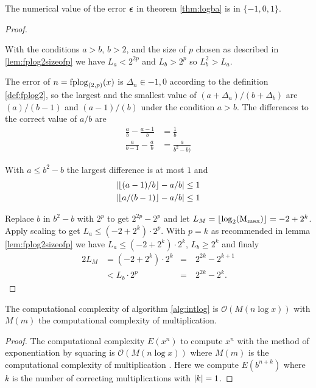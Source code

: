 \begin{cor}\label{cor:deltaisone}
The numerical value of the error $\boldsymbol{\epsilon}$ in theorem \ref{thm:logba} is in $\{-1, 0, 1\}$.
\end{cor}
\begin{proof}\label{proof:deltaisone}
\begin{proofsec}\label{proofsec:lalbratio}
With the conditions $a > b$, $b > 2$, and the size of $p$ chosen as described in
\ref{lem:fplog2sizeofp} we have $L_a < 2^{2p}$ and $L_b > 2^p$ so $L_b^2 > L_a $.
\end{proofsec}
\begin{proofsec}
The error of $n = \operatorname{fplog}_{(2,p)}(x)$ is $\Delta_n \in {-1, 0}$ according to the
definition \ref{def:fplog2}, so the largest and the smallest value of
$(a+\Delta_a)/(b + \Delta_b)$ are $(a)/(b-1)$
and $(a-1)/(b)$ under the condition $a>b$. The differences to the correct value of $a/b$ are
\begin{align}
\frac{a}{b} - \frac{a-1}{b} &= \frac{1}{b}\\
\frac{a}{b-1} - \frac{a}{b} &= \frac{a}{b^2 - b)}
\end{align}


With $a \le b^2 - b$ the largest difference is at most $1$ and
\begin{align}
\left\lvert\left\lfloor(a-1)/b\right\rfloor - a/b\right\rvert &\le 1\\
\left\lvert\left\lfloor a/(b-1)\right\rfloor - a/b\right\rvert &\le 1
\end{align}
\end{proofsec}
Replace $b$ in $b^2 - b$ with $2^p$ to get $2^{2p} - 2^p$ and let
$L_M =\left\lfloor\log_2(\textrm{M}_{\textrm{max}})\right\rfloor = -2 + 2^k$.
Apply scaling to get $L_a \le (-2 + 2^k)\cdot 2^p$. With $p = k$ as recommended in
lemma \ref{lem:fplog2sizeofp} we have $L_a \le (-2 + 2^k)\cdot 2^k$, $L_b \ge 2^k$ and
finaly
\begin{alignat}{2}
 L_M &= (-2 + 2^k)\cdot 2^k &=&\: 2^{2k} - 2^{k + 1}\\ 
     &< L_b \cdot 2^p &=&\:  2^{2k} - 2^k.
\end{alignat}
\end{proof}


\begin{lem}
The computational complexity of algorithm \ref{alg:intlog}  is $\mathcal{O}(M(n \log x))$ with
$M(m)$ the computational complexity of multiplication.
\end{lem}
\begin{proof}
The computational complexity $E(x^n)$ to compute $x^n$ with the method of
exponentiation by squaring is $\mathcal{O}(M(n \log x))$ where $M(m)$ is the computational complexity of
multiplication \citep{knuth97seminum}. Here we compute $E(b^{n+k})$ where $k$ is the number of correcting
multiplications with $\left\lvert k\right\rvert = 1$.
\end{proof}
